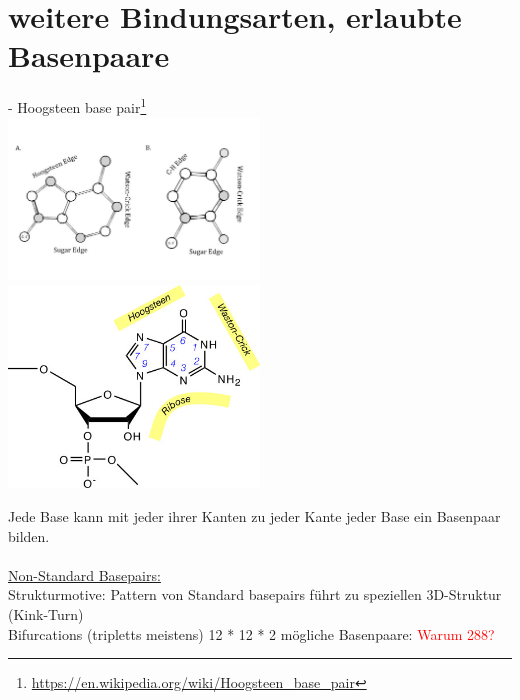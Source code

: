 \section{weitere Bindungsarten, erlaubte Basenpaare}
 - Hoogsteen base pair\footnote{\url{https://en.wikipedia.org/wiki/Hoogsteen_base_pair}}\\
\includegraphics[width=0.5\textwidth]{lectures/160530/pix/Edge_Labels.jpg}
\includegraphics[width=0.5\textwidth]{lectures/160530/pix/440px-NucleotideFaces.jpg}

Jede Base kann mit jeder ihrer Kanten zu jeder Kante jeder Base ein Basenpaar bilden.
\\\\
\underline{Non-Standard Basepairs:}\\
Strukturmotive: Pattern von Standard basepairs führt zu speziellen 3D-Struktur (Kink-Turn)\\
Bifurcations (tripletts meistens)
12 * 12 * 2 mögliche Basenpaare: \textcolor{red}{Warum 288?}\\

